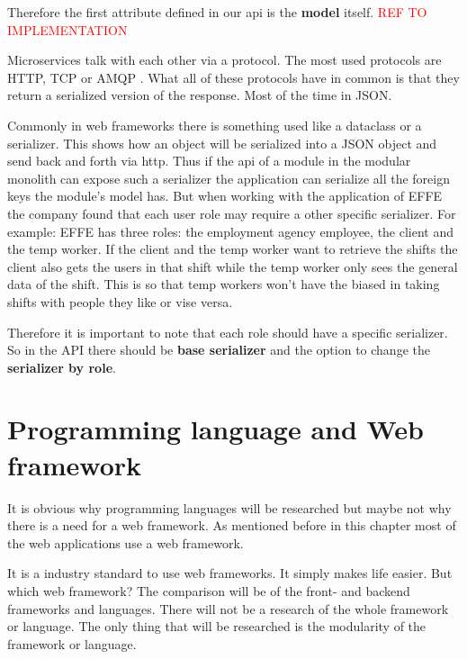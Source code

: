 Therefore the first attribute defined in our api is the \textbf{model} itself. \textcolor{red}{REF TO IMPLEMENTATION}

Microservices talk with each other via a protocol. The most used protocols are HTTP, TCP or AMQP \cite{microservicesAPI}. What all of these protocols have in common is that they return a serialized version of the response. Most of the time in JSON.

Commonly in web frameworks there is something used like a dataclass or a serializer. This shows how an object will be serialized into a JSON object and send back and forth via http. Thus if the api of a module in the modular monolith can expose such a serializer the application can serialize all the foreign keys the module's model has. But when working with the application of EFFE the company found that each user role may require a other specific serializer. For example: EFFE has three roles: the employment agency employee, the client and the temp worker. If the client and the temp worker want to retrieve the shifts the client also gets the users in that shift while the temp worker only sees the general data of the shift. This is so that temp workers won't have the biased in taking shifts with people they like or vise versa.

Therefore it is important to note that each role should have a specific serializer. So in the API there should be \textbf{base serializer} and the option to change the \textbf{serializer by role}.

\section{Programming language and Web framework}

It is obvious why programming languages will be researched but maybe not why there is a need for a web framework. As mentioned before in this chapter most of the web applications use a web framework.


It is a industry standard to use web frameworks. It simply makes life easier. But which web framework? The comparison will be of the front- and backend frameworks and languages. There will not be a research of the whole framework or language. The only thing that will be researched is the modularity of the framework or language.

